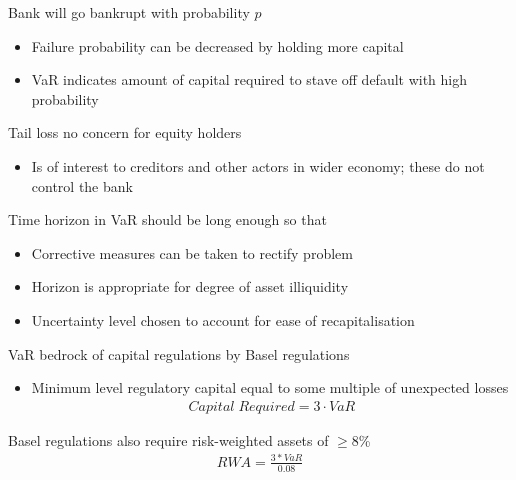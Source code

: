 \documentclass{beamer}
\begin{document}
\begin{frame}
  Bank will go bankrupt with probability $p$
  \begin{itemize}
    \item Failure probability can be decreased by holding more capital
    \item VaR indicates amount of capital required to stave off default with high probability
  \end{itemize}
  \medskip
  Tail loss no concern for equity holders
  \begin{itemize}
    \item Is of interest to creditors and other actors in wider economy; these do not control the bank
  \end{itemize}
\end{frame}

\begin{frame}
  Time horizon in VaR should be long enough so that
  \begin{itemize}
    \item Corrective measures can be taken to rectify problem
    \item Horizon is appropriate for degree of asset illiquidity
    \item Uncertainty level chosen to account for ease of recapitalisation
  \end{itemize}
\end{frame}


\begin{frame}
 VaR bedrock of capital regulations by Basel regulations
  \begin{itemize}
    \item Minimum level regulatory capital equal to some multiple of unexpected losses
    \begin{align*}
      Capital\; Required = 3\cdot VaR
    \end{align*}
  \end{itemize}
   Basel regulations also require risk-weighted assets of $\geq$8\%
\begin{align*} 
  RWA=\frac{3*VaR}{0.08} 
\end{align*}

\end{frame}
\end{document}
